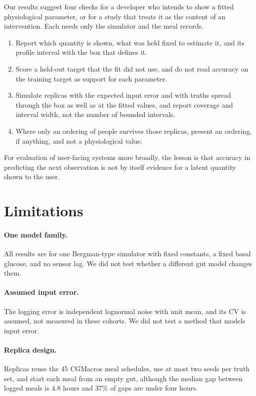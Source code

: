 \documentclass[letterpaper]{article} %
\newcommand{\resOverlapMedianGap}{4.8}
\newcommand{\resOverlapWithinFour}{37}
\newcommand{\wsN}{45}
\begin{document}
Our results suggest four checks for a developer who intends to show a fitted physiological parameter, or for a study that treats it as the content of an intervention. Each needs only the simulator and the meal records.
\begin{enumerate}
\item Report which quantity is shown, what was held fixed to estimate it, and its profile interval with the box that defines it.
\item Score a held-out target that the fit did not use, and do not read accuracy on the training target as support for each parameter.
\item Simulate replicas with the expected input error and with truths spread through the box as well as at the fitted values, and report coverage and interval width, not the number of bounded intervals.
\item Where only an ordering of people survives those replicas, present an ordering, if anything, and not a physiological value.
\end{enumerate}
For evaluation of user-facing systems more broadly, the lesson is that accuracy in predicting the next observation is not by itself evidence for a latent quantity shown to the user.

\section{Limitations}

\paragraph{One model family.} All results are for one Bergman-type simulator with fixed constants, a fixed basal glucose, and no sensor lag. We did not test whether a different gut model changes them.

\paragraph{Assumed input error.} The logging error is independent lognormal noise with unit mean, and its CV is assumed, not measured in these cohorts. We did not test a method that models input error.

\paragraph{Replica design.} Replicas reuse the \wsN{} CGMacros meal schedules, use at most two seeds per truth set, and start each meal from an empty gut, although the median gap between logged meals is \resOverlapMedianGap{} hours and \resOverlapWithinFour\% of gaps are under four hours.
\end{document}
